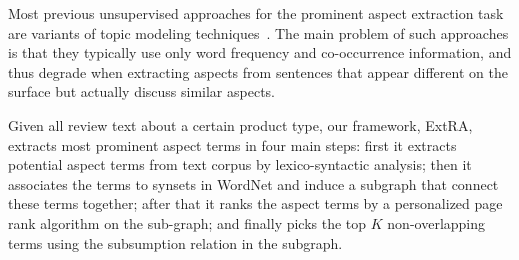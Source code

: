 Most previous unsupervised approaches for the prominent 
aspect extraction task are variants of topic modeling 
techniques~\cite{lakkaraju2011exploiting,lin2009joint,wang2011latent}.
The main problem of such approaches 
is that they typically use only word frequency and co-occurrence information, 
and thus degrade when extracting aspects from sentences that appear
different on the surface but actually discuss similar aspects. 

Given all review text about a certain product type, our framework, ExtRA,
extracts most prominent aspect terms in four main steps: 
first it extracts potential aspect terms from text corpus by lexico-syntactic 
analysis; then it associates
the terms to synsets in WordNet and induce a subgraph that connect these
terms together; after that it ranks the aspect terms by a personalized page rank
algorithm on the sub-graph; and finally picks the top $K$ non-overlapping 
terms using the subsumption relation in the subgraph. 


